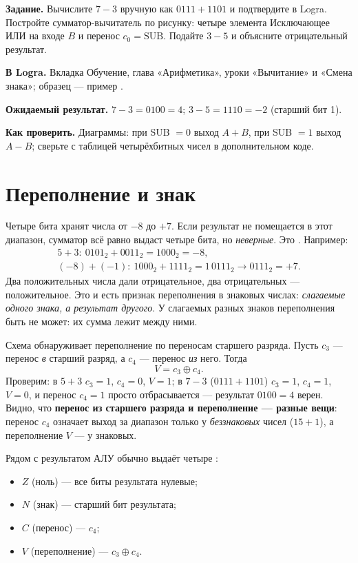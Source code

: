 \begin{diybox}[Вычитание]
\textbf{Задание.}  Вычислите $7-3$ вручную как $0111+1101$ и
подтвердите в Logra.  Постройте сумматор-вычитатель по
рисунку: четыре элемента Исключающее ИЛИ на входе $B$ и перенос $c_0=\text{SUB}$.
 Подайте $3-5$ и объясните отрицательный результат.

\textbf{В Logra.} Вкладка Обучение, глава «Арифметика», уроки
«Вычитание» и «Смена знака»; образец --- пример .

\textbf{Ожидаемый результат.} $7-3=0100=4$; $3-5=1110=-2$ (старший бит 1).

\textbf{Как проверить.} Диаграммы: при SUB $=0$ выход $A+B$, при SUB $=1$
выход $A-B$; сверьте с таблицей четырёхбитных чисел в дополнительном коде.
\end{diybox}

\section{Переполнение и знак}

Четыре бита хранят числа от $-8$ до $+7$. Если результат не помещается в этот
диапазон, сумматор всё равно выдаст четыре бита, но \emph{неверные}. Это
. Например:
\begin{gather*}
  5 + 3:\ 0101_2 + 0011_2 = 1000_2 = -8, \\
  (-8) + (-1):\ 1000_2 + 1111_2 = 1\,0111_2 \to 0111_2 = +7.
\end{gather*}
Два положительных числа дали отрицательное, два отрицательных --- положительное.
Это и есть признак переполнения в знаковых числах:
\emph{слагаемые одного знака, а результат другого}. У слагаемых разных знаков
переполнения быть не может: их сумма лежит между ними.

Схема обнаруживает переполнение по переносам старшего разряда. Пусть $c_3$ ---
перенос \emph{в} старший разряд, а $c_4$ --- перенос \emph{из} него. Тогда
\[
  V = c_3 \oplus c_4 .
\]
Проверим: в $5+3$ $c_3=1$, $c_4=0$, $V=1$; в $7-3$ ($0111+1101$) $c_3=1$,
$c_4=1$, $V=0$, и перенос $c_4=1$ просто отбрасывается --- результат $0100=4$
верен. Видно, что \textbf{перенос из старшего разряда и переполнение ---
разные вещи}: перенос $c_4$ означает выход за диапазон только у
\emph{беззнаковых} чисел ($15+1$), а переполнение $V$ --- у знаковых.

Рядом с результатом АЛУ обычно выдаёт четыре :
\begin{itemize}
  \item $Z$ (ноль) --- все биты результата нулевые;
  \item $N$ (знак) --- старший бит результата;
  \item $C$ (перенос) --- $c_4$;
  \item $V$ (переполнение) --- $c_3\oplus c_4$.
\end{itemize}


